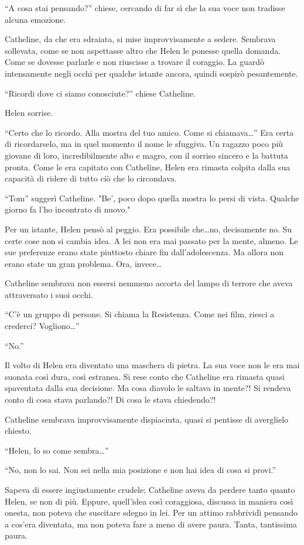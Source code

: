 ``A cosa stai pensando?'' chiese, cercando di far sì che la sua voce non tradisse alcuna emozione.

Catheline, da che era sdraiata, si mise improvvisamente a sedere. Sembrava sollevata, come se non
aspettasse altro che Helen le ponesse quella domanda. Come se dovesse parlarle e non riuscisse a
trovare il coraggio. La guardò intensamente negli occhi per qualche istante ancora, quindi sospirò
pesantemente.

``Ricordi dove ci siamo conosciute?'' chiese Catheline.

Helen sorrise.

``Certo che lo ricordo. Alla mostra del tuo amico. Come si chiamava\dots'' Era certa di ricordarselo,
ma in quel momento il nome le sfuggiva. Un ragazzo poco più giovane di loro, incredibilmente alto e
magro, con il sorriso sincero e la battuta pronta. Come le era capitato con Catheline, Helen era
rimasta colpita dalla sua capacità di ridere di tutto ciò che lo circondava.

``Tom'' suggerì Catheline. "Be', poco dopo quella mostra lo persi di vista. Qualche giorno fa l'ho
incontrato di nuovo."

Per un istante, Helen pensò al peggio. Era possibile che\dots no, decisamente no. Su certe cose non si
cambia idea. A lei non era mai passato per la mente, almeno. Le sue preferenze erano state piuttosto
chiare fin dall'adolescenza. Ma allora non erano state un gran problema. Ora, invece\dots

Catheline sembrava non essersi nemmeno accorta del lampo di terrore che aveva attraversato i suoi
occhi.

``C'è un gruppo di persone. Si chiama la Resistenza. Come nei film, riesci a crederci?
Vogliono\dots''

``No.''

Il volto di Helen era diventato una maschera di pietra. La sua voce non le era mai suonata così
dura, così estranea. Si rese conto che Catheline era rimasta quasi spaventata dalla sua decisione.
Ma cosa diavolo le saltava in mente?! Si rendeva conto di cosa stava parlando?! Di cosa le stava
chiedendo?!

Catheline sembrava improvvisamente dispiaciuta, quasi si pentisse di averglielo chiesto.

``Helen, lo so come sembra\dots''

``No, non lo sai. Non sei nella mia posizione e non hai idea di cosa si provi.''

Sapeva di essere ingiustamente crudele; Catheline aveva da perdere tanto quanto Helen, se non di
più. Eppure, quell'idea così coraggiosa, discussa in maniera così onesta, non poteva che suscitare
sdegno in lei. Per un attimo rabbrividì pensando a cos'era diventata, ma non poteva fare a meno di
avere paura. Tanta, tantissima paura.


